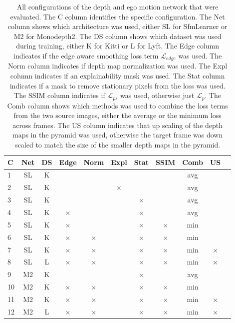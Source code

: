 \begin{table}[H]
\centering
\begin{tabular}{|l|c|c||c|c||c|c||c|c|c|c|}
\hline
C & Net & DS & Edge & Norm & Expl & Stat & SSIM & Comb & US \\
\hline
1 & SL & K &  &  &  &  &  & avg &  \\
\hline
2 & SL & K &  &  & $ \times $ &  &  & avg &  \\
\hline
3 & SL & K &  &  &  & $ \times $ &  & avg &  \\
\hline
4 & SL & K & $ \times $ &  &  & $ \times $ &  & avg &  \\
\hline
5 & SL & K & $ \times $ &  &  & $ \times $ & $ \times $ & min &  \\
\hline
6 & SL & K & $ \times $ & $ \times $ &  & $ \times $ & $ \times $ & min &  \\
\hline
7 & SL & K & $ \times $ & $ \times $ &  & $ \times $ & $ \times $ & min & $ \times $ \\
\hline
8 & SL & L & $ \times $ & $ \times $ &  & $ \times $ & $ \times $ & min & $ \times $ \\
\hline
9 & M2 & K &  &  &  & $ \times $ &  & avg &  \\
\hline
10 & M2 & K & $ \times $ & $ \times $ &  & $ \times $ & $ \times $ & min &  \\
\hline
11 & M2 & K & $ \times $ & $ \times $ &  & $ \times $ & $ \times $ & min & $ \times $ \\
\hline
12 & M2 & L & $ \times $ & $ \times $ &  & $ \times $ & $ \times $ & min & $ \times $ \\
\hline
\end{tabular}
\caption{All configurations of the depth and ego motion network that were evaluated. The C column identifies the specific configuration. The Net column shows which architecture was used, either SL for SfmLearner or M2 for Monodepth2. The DS column shows which dataset was used during training, either K for Kitti or L for Lyft. The Edge column indicates if the edge aware smoothing loss term $\mathcal{L}_{edge}$ was used. The Norm column indicates if depth map normalization was used. The Expl column indicates if an explainability mask was used. The Stat column indicates if a mask to remove stationary pixels from the loss was used. The SSIM column indicates if $\mathcal{L}_{ps}$ was used, otherwise just $\mathcal{L}_{p}$. The Comb column shows which methods was used to combine the loss terms from the two source images, either the average or the minimum loss across frames. The US column indicates that up scaling of the depth maps in the pyramid was used, otherwise the target frame was down scaled to match the size of the smaller depth maps in the pyramid.}
\label{table:configurations}
\end{table}


